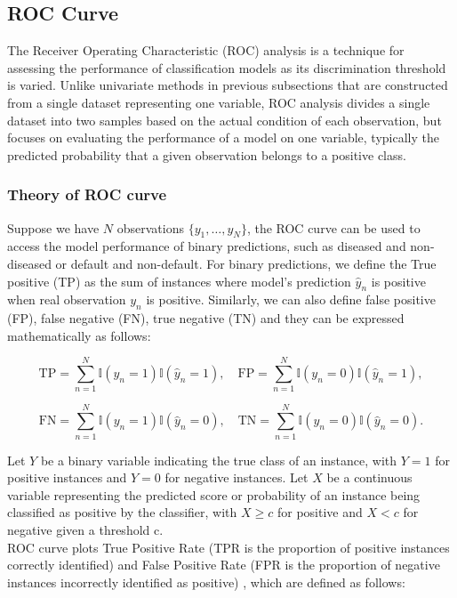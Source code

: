 \documentclass{article}\usepackage[]{graphicx}\usepackage[]{xcolor}
\numberwithin{equation}{section}
\begin{document}
\subsection{ROC Curve}

The Receiver Operating Characteristic (ROC) analysis is a technique for assessing the performance of classification models as its discrimination threshold is varied. Unlike univariate methods in previous subsections that are constructed from a single dataset representing one variable, ROC analysis divides a single dataset into two samples based on the actual condition of each observation, but focuses on evaluating the performance of a model on one variable, typically the predicted probability that a given observation belongs to a positive class.

\subsubsection{Theory of ROC curve}

Suppose we have $N$ observations $\{y_1,\dots,y_N\}$, the ROC curve can be used to access the model performance of binary predictions, such as diseased and non-diseased or default and non-default. For binary predictions, we define the True positive (TP) as the sum of instances where model's prediction $\hat{y}_n$ is positive when real observation $y_n$ is positive. Similarly, we can also define false positive (FP), false negative (FN), true negative (TN) \cite{ml} and they can be expressed mathematically as follows:

\[\text{TP} = \sum^{N}_{n=1} \mathbb{I}(y_n = 1) \mathbb{I}(\hat{y}_n = 1), \quad \text{FP} = \sum^{N}_{n=1} \mathbb{I}(y_n = 0) \mathbb{I}(\hat{y}_n = 1),\]

\[\text{FN} = \sum^{N}_{n=1} \mathbb{I}(y_n = 1) \mathbb{I}(\hat{y}_n = 0), \quad \text{TN} = \sum^{N}_{n=1} \mathbb{I}(y_n = 0) \mathbb{I}(\hat{y}_n = 0).\]

\noindent
Let $Y$ be a binary variable indicating the true class of an instance, with $Y = 1$ for positive instances and $Y = 0$ for negative instances. Let $X$ be a continuous variable representing the predicted score or probability of an instance being classified as positive by the classifier, with $X \geq c$ for positive and $X < c$ for negative given a threshold c.\\

\noindent
ROC curve plots True Positive Rate (TPR is the proportion of positive instances correctly identified) and False Positive Rate (FPR is the proportion of negative instances incorrectly identified as positive) \cite{rocAnalysis}, which are defined as follows:
\end{document}
